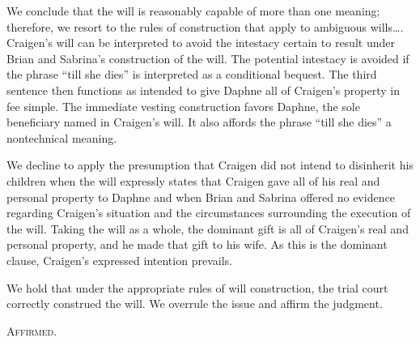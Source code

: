We conclude that the will is reasonably capable of more than one meaning;
therefore, we resort to the rules of construction that apply to ambiguous
wills\dots. Craigen's will can be interpreted to avoid the intestacy certain
to result under Brian and Sabrina's construction of the will. The potential
intestacy is avoided if the phrase ``till she dies'' is interpreted as a
conditional bequest. The third sentence then functions as intended to give
Daphne all of Craigen's property in fee simple. The immediate vesting
construction favors Daphne, the sole beneficiary named in Craigen's will. It
also affords the phrase ``till she dies'' a nontechnical meaning.

We decline to apply the presumption that Craigen did not intend to disinherit
his children when the will expressly states that Craigen gave all of his real
and personal property to Daphne and when Brian and Sabrina offered no evidence
regarding Craigen's situation and the circumstances surrounding the execution
of the will. Taking the will as a whole, the dominant gift is all of Craigen's
real and personal property, and he made that gift to his wife. As this is the
dominant clause, Craigen's expressed intention prevails.

We hold that under the appropriate rules of will construction, the trial court
correctly construed the will. We overrule the issue and affirm the judgment.

\textsc{Affirmed}.

